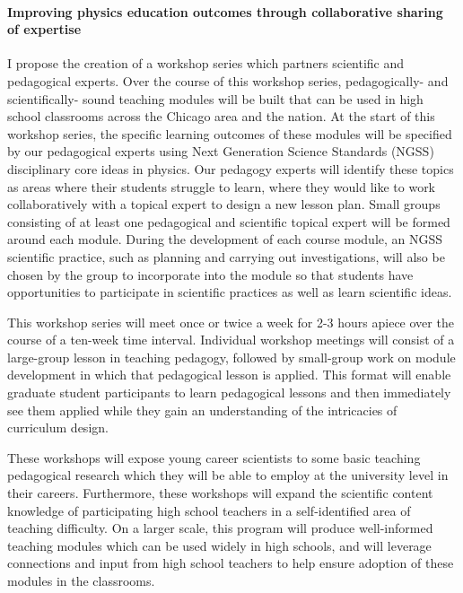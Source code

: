 \documentclass[11pt, preprint]{aastex}
\begin{document}
\vspace{-0.5cm}
\paragraph{Improving physics education outcomes through collaborative sharing of expertise}
I propose the creation of a workshop series which partners scientific and pedagogical experts.
Over the course of this workshop series, pedagogically- and scientifically- sound teaching modules will be built that can be used in high school classrooms across the Chicago area and the nation.
At the start of this workshop series, the specific learning outcomes of these modules will be specified by our pedagogical experts using Next Generation Science Standards (NGSS) disciplinary core ideas in physics.
Our pedagogy experts will identify these topics as areas where their students struggle to learn, where they would like to work collaboratively with a topical expert to design a new lesson plan.
Small groups consisting of at least one pedagogical and scientific topical expert will be formed around each module.
During the development of each course module, an NGSS scientific practice, such as planning and carrying out investigations, will also be chosen by the group to incorporate into the module so that students have opportunities to participate in scientific practices as well as learn scientific ideas.

This workshop series will meet once or twice a week for 2-3 hours apiece over the course of a ten-week time interval.
Individual workshop meetings will consist of a large-group lesson in teaching pedagogy, followed by small-group work on module development in which that pedagogical lesson is applied.
This format will enable graduate student participants to learn pedagogical lessons and then immediately see them applied while they gain an understanding of the intricacies of curriculum design.

These workshops will expose young career scientists to some basic teaching pedagogical research which they will be able to employ at the university level in their careers.
Furthermore, these workshops will expand the scientific content knowledge of participating high school teachers in a self-identified area of teaching difficulty.
On a larger scale, this program will produce well-informed teaching modules which can be used widely in high schools, and will leverage connections and input from high school teachers to help ensure adoption of these modules in the classrooms.
\end{document}
